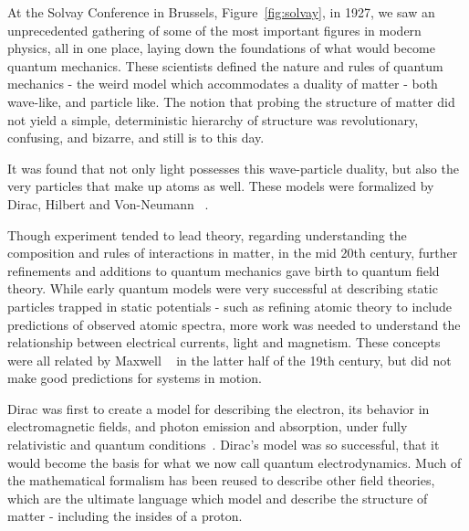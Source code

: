 At the Solvay Conference in Brussels, Figure~\ref{fig:solvay}, in 1927, we saw
an unprecedented gathering of some of the most important figures in modern
physics, all in one place, laying down the foundations of what would become
quantum mechanics. These scientists defined the nature and rules of quantum
mechanics - the weird model which accommodates a duality of matter - both
wave-like, and particle like. The notion that probing the structure of matter
did not yield a simple, deterministic hierarchy of structure was revolutionary,
confusing, and bizarre, and still is to this day.

It was found that not only light possesses this wave-particle duality, but also
the very particles that make up atoms as well. These models were formalized by
Dirac, Hilbert and Von-Neumann ~\needcite{}.

Though experiment tended to lead theory, regarding understanding the composition
and rules of interactions in matter, in the mid 20th century, further
refinements and additions to quantum mechanics gave birth to quantum field
theory. While early quantum models were very successful at describing static
particles trapped in static potentials - such as refining atomic theory to
include predictions of observed atomic spectra, more work was needed to
understand the relationship between electrical currents, light and magnetism.
These concepts were all related by Maxwell ~\needcite{} in the latter half of
the 19th century, but did not make good predictions for systems in motion.

Dirac was first to create a model for describing the electron, its behavior in
electromagnetic fields, and photon emission and absorption, under fully
relativistic and quantum conditions~\needcite{}. Dirac's model was so
successful, that it would become the basis for what we now call quantum
electrodynamics. Much of the mathematical formalism has been reused to describe
other field theories, which are the ultimate language which model and describe
the structure of matter - including the insides of a proton. 

